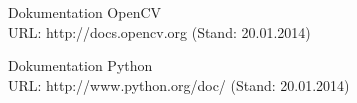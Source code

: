 \begin{thebibliography}{sotief}

Dokumentation OpenCV
\newblock \\URL: http://docs.opencv.org (Stand: 20.01.2014)

Dokumentation Python
\newblock \\URL: http://www.python.org/doc/ (Stand: 20.01.2014)

\end{thebibliography}
